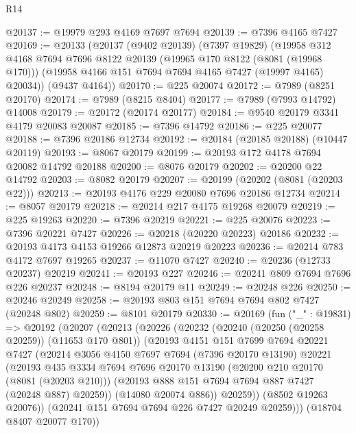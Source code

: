 \begin{lexlean}{R14}
\begin{coremodule}
@20137 := @19979 @293 @4169 @7697 @7694
@20139 := @7396 @4165 @7427
@20169 := @20133
    (@20137
      (@9402 @20139)
      (@7397 @19829)
      (@19958
        @312
        @4168
        @7694
        @7696
        @8122
        @20139
        (@19965 @170 @8122 (@8081 (@19968 @170)))
        (@19958 @4166 @151 @7694 @7694 @4165 @7427 (@19997 @4165) @20034))
      (@9437 @4164))
@20170 := @225 @20074
@20172 := @7989 (@8251 @20170)
@20174 := @7989 (@8215 @8404)
@20177 := @7989 (@7993 @14792) @14008
@20179 := @20172 (@20174 @20177)
@20184 := @9540 @20179 @3341 @4179 @20083 @20087
@20185 := @7396 @14792
@20186 := @225 @20077
@20188 := @7396 @20186 @12734
@20192 := @20184 (@20185 @20188) (@10447 @20119)
@20193 := @8067 @20179
@20199 := @20193 @172 @4178 @7694 @20082 @14792 @20188
@20200 := @8076 @20179
@20202 := @20200 @22 @14792
@20203 := @8082 @20179
@20207 := @20199 (@20202 (@8081 (@20203 @22)))
@20213 := @20193 @4176 @229 @20080 @7696 @20186 @12734
@20214 := @8057 @20179
@20218 := @20214 @217 @4175 @19268 @20079
@20219 := @225 @19263
@20220 := @7396 @20219
@20221 := @225 @20076
@20223 := @7396 @20221 @7427
@20226 := @20218 (@20220 @20223) @20186
@20232 := @20193 @4173 @4153 @19266 @12873 @20219 @20223
@20236 := @20214 @783 @4172 @7697 @19265
@20237 := @11070 @7427
@20240 := @20236 (@12733 @20237) @20219
@20241 := @20193 @227
@20246 := @20241 @809 @7694 @7696 @226 @20237
@20248 := @8194 @20179 @11
@20249 := @20248 @226
@20250 := @20246 @20249
@20258 := @20193 @803 @151 @7694 @7694 @802 @7427 (@20248 @802)
@20259 := @8101 @20179
@20330 := @20169
    (fun ("_" : @19831) =>
    @20192
      (@20207
        (@20213
          (@20226
            (@20232
              (@20240 (@20250 (@20258 @20259)) (@11653 @170 @801))
              (@20193
                @4151
                @151
                @7699
                @7694
                @20221
                @7427
                (@20214
                  @3056
                  @4150
                  @7697
                  @7694
                  (@7396 @20170 @13190)
                  @20221
                  (@20193
                    @435
                    @3334
                    @7694
                    @7696
                    @20170
                    @13190
                    (@20200 @210 @20170 (@8081 (@20203 @210)))
                    (@20193 @888 @151 @7694 @7694 @887 @7427 (@20248 @887) @20259))
                  (@14080 @20074 @886))
                @20259))
            (@8502 @19263 @20076))
          (@20241 @151 @7694 @7694 @226 @7427 @20249 @20259)))
      (@18704 @8407 @20077 @170))

\end{coremodule}
\end{lexlean}

